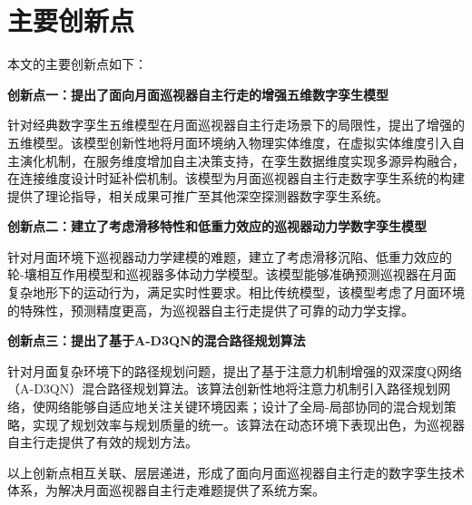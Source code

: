 \section{主要创新点}
\label{sec:innovations}

本文的主要创新点如下：

\textbf{创新点一：提出了面向月面巡视器自主行走的增强五维数字孪生模型}

针对经典数字孪生五维模型在月面巡视器自主行走场景下的局限性，提出了增强的五维模型。该模型创新性地将月面环境纳入物理实体维度，在虚拟实体维度引入自主演化机制，在服务维度增加自主决策支持，在孪生数据维度实现多源异构融合，在连接维度设计时延补偿机制。该模型为月面巡视器自主行走数字孪生系统的构建提供了理论指导，相关成果可推广至其他深空探测器数字孪生系统。

\textbf{创新点二：建立了考虑滑移特性和低重力效应的巡视器动力学数字孪生模型}

针对月面环境下巡视器动力学建模的难题，建立了考虑滑移沉陷、低重力效应的轮-壤相互作用模型和巡视器多体动力学模型。该模型能够准确预测巡视器在月面复杂地形下的运动行为，满足实时性要求。相比传统模型，该模型考虑了月面环境的特殊性，预测精度更高，为巡视器自主行走提供了可靠的动力学支撑。

\textbf{创新点三：提出了基于A-D3QN的混合路径规划算法}

针对月面复杂环境下的路径规划问题，提出了基于注意力机制增强的双深度Q网络（A-D3QN）混合路径规划算法。该算法创新性地将注意力机制引入路径规划网络，使网络能够自适应地关注关键环境因素；设计了全局-局部协同的混合规划策略，实现了规划效率与规划质量的统一。该算法在动态环境下表现出色，为巡视器自主行走提供了有效的规划方法。

以上创新点相互关联、层层递进，形成了面向月面巡视器自主行走的数字孪生技术体系，为解决月面巡视器自主行走难题提供了系统方案。
